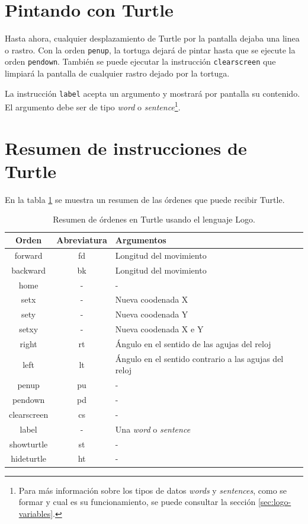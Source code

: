 \section*{Pintando con Turtle}

Hasta ahora, cualquier desplazamiento de Turtle por la pantalla dejaba una linea o rastro. Con la orden \texttt{penup}, la tortuga dejará de pintar hasta que se ejecute la orden \texttt{pendown}. También se puede ejecutar la instrucción \texttt{clearscreen} que limpiará la pantalla de cualquier rastro dejado por la tortuga.

La instrucción \texttt{label} acepta un argumento y mostrará por pantalla su contenido. El argumento debe ser de tipo \emph{word} o \emph{sentence}\footnote{Para más información sobre los tipos de datos \emph{words} y \emph{sentences}, como se formar y cual es su funcionamiento, se puede consultar la sección \ref{sec:logo-variables}.}.

\section*{Resumen de instrucciones de Turtle}


En la tabla \ref{tab:turtle-lenguaje} se muestra un resumen de las órdenes que puede recibir Turtle.

\begin{table}[!ht]
	\begin{centering}
		\begin{tabular}{c|c|l}
Orden & Abreviatura & Argumentos\\
\hline
forward & fd & Longitud del movimiento\\
backward & bk & Longitud del movimiento\\
home & - & -\\
setx & - & Nueva coodenada X\\
sety & - & Nueva coodenada Y\\
setxy & - & Nueva coodenada X e Y\\
right & rt & Ángulo en el sentido de las agujas del reloj\\
left & lt & Ángulo en el sentido contrario a las agujas del reloj\\
penup & pu & -\\
pendown & pd & -\\
clearscreen & cs & -\\
label & - & Una \emph{word} o \emph{sentence}\\
showturtle & st & -\\
hideturtle & ht & -\\
\end{tabular}
	\caption{Resumen de órdenes en Turtle usando el lenguaje Logo.}
		\label{tab:turtle-lenguaje}
	\end{centering}
\end{table}



